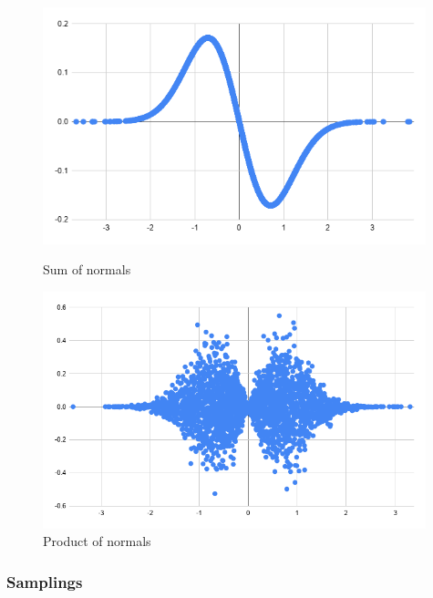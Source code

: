 \documentclass[a4paper,11pt]{article}
\theoremstyle{mytheor}
\begin{document}
    \begin{figure}[H]
    \centering
    \begin{minipage}{0.49\textwidth}
        \centering
        \includegraphics[width=0.99\textwidth]{testing/diff.png} %
        \caption{Sum of normals}
        \label{test1}
    \end{minipage}\hfill
    \begin{minipage}{0.49\textwidth}
        \centering
        \includegraphics[width=0.99\textwidth]{testing/diff1.png} %
        \caption{Product of normals}
        \label{test2}
    \end{minipage}
    
    \end{figure}
        
        
    \subsubsection{Samplings}
    
\end{document}

